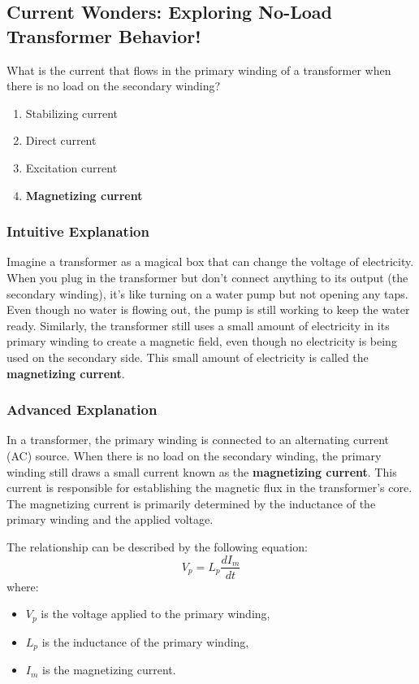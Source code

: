 \subsection{Current Wonders: Exploring No-Load Transformer Behavior!}

\begin{tcolorbox}[colback=gray!10!white,colframe=black!75!black,title=E6D07] What is the current that flows in the primary winding of a transformer when there is no load on the secondary winding?
    \begin{enumerate}[label=\Alph*.]
        \item Stabilizing current
        \item Direct current
        \item Excitation current
        \item \textbf{Magnetizing current}
    \end{enumerate}
\end{tcolorbox}

\subsubsection{Intuitive Explanation}
Imagine a transformer as a magical box that can change the voltage of electricity. When you plug in the transformer but don’t connect anything to its output (the secondary winding), it’s like turning on a water pump but not opening any taps. Even though no water is flowing out, the pump is still working to keep the water ready. Similarly, the transformer still uses a small amount of electricity in its primary winding to create a magnetic field, even though no electricity is being used on the secondary side. This small amount of electricity is called the \textbf{magnetizing current}.

\subsubsection{Advanced Explanation}
In a transformer, the primary winding is connected to an alternating current (AC) source. When there is no load on the secondary winding, the primary winding still draws a small current known as the \textbf{magnetizing current}. This current is responsible for establishing the magnetic flux in the transformer's core. The magnetizing current is primarily determined by the inductance of the primary winding and the applied voltage.

The relationship can be described by the following equation:
\[
V_p = L_p \frac{dI_m}{dt}
\]
where:
\begin{itemize}
    \item \( V_p \) is the voltage applied to the primary winding,
    \item \( L_p \) is the inductance of the primary winding,
    \item \( I_m \) is the magnetizing current.
\end{itemize}

